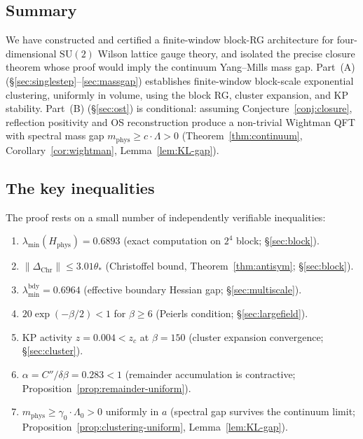 \documentclass[11pt]{article}
\theoremstyle{definition}
\newcommand{\SU}{\mathrm{SU}}
\begin{document}
\subsection{Summary}

We have constructed and certified a finite-window block-RG architecture for four-dimensional $\SU(2)$ Wilson lattice gauge theory, and isolated the precise closure theorem whose proof would imply the continuum Yang--Mills mass gap.  Part~(A) (\S\ref{sec:singlestep}--\ref{sec:massgap}) establishes finite-window block-scale exponential clustering, uniformly in volume, using the block RG, cluster expansion, and KP stability.  Part~(B) (\S\ref{sec:ost}) is conditional: assuming Conjecture~\ref{conj:closure}, reflection positivity and OS reconstruction produce a non-trivial Wightman QFT with spectral mass gap $m_{\mathrm{phys}}\ge c\cdot\Lambda>0$ (Theorem~\ref{thm:continuum}, Corollary~\ref{cor:wightman}, Lemma~\ref{lem:KL-gap}).

\subsection{The key inequalities}

The proof rests on a small number of independently verifiable
inequalities:

\begin{enumerate}
\item $\lambda_{\min}(H_{\mathrm{phys}})=0.6893$
(exact computation on $2^4$ block; \S\ref{sec:block}).
\item $\|\Delta_{\mathrm{Chr}}\|\le 3.01\theta_*$ (Christoffel bound, Theorem~\ref{thm:antisym};
\S\ref{sec:block}).
\item $\lambda_{\min}^{\mathrm{bdy}}=0.6964$ (effective boundary
Hessian gap; \S\ref{sec:multiscale}).
\item $20\exp(-\beta/2)<1$ for $\beta\ge 6$ (Peierls condition;
\S\ref{sec:largefield}).
\item KP activity $z=0.004<z_c$ at $\beta=150$ (cluster expansion
convergence; \S\ref{sec:cluster}).
\item $\alpha=C''/\delta\beta=0.283<1$ (remainder accumulation
is contractive; Proposition~\ref{prop:remainder-uniform}).
\item $m_{\mathrm{phys}}\ge\gamma_0\cdot\Lambda_0>0$ uniformly
in $a$ (spectral gap survives the continuum limit;
Proposition~\ref{prop:clustering-uniform},
Lemma~\ref{lem:KL-gap}).
\end{enumerate}
\end{document}
